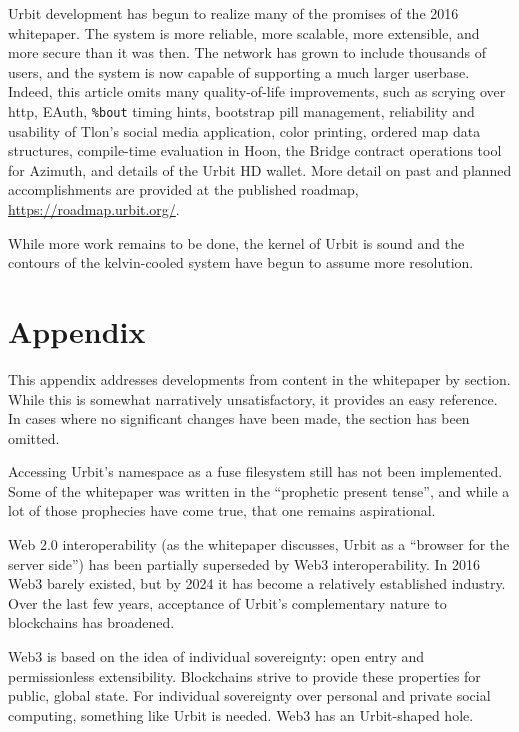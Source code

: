 \documentclass[twoside]{article}
\begin{document}
Urbit development has begun to realize many of the promises of the 2016 whitepaper.  The system is more reliable, more scalable, more extensible, and more secure than it was then.  The network has grown to include thousands of users, and the system is now capable of supporting a much larger userbase.  Indeed, this article omits many quality-of-life improvements, such as scrying over {\sc http}, EAuth, \lstinline[style=inlinecode]{%bout} timing hints, bootstrap pill management, reliability and usability of Tlon's social media application, color printing, ordered map data structures, compile-time evaluation in Hoon, the Bridge contract operations tool for Azimuth, and details of the Urbit HD wallet.  More detail on past and planned accomplishments are provided at the published roadmap, \url{https://roadmap.urbit.org/}.

While more work remains to be done, the kernel of Urbit is sound and the contours of the kelvin-cooled system have begun to assume more resolution.  \tombstone{}

\section*{Appendix}

This appendix addresses developments from content in the whitepaper by section.  While this is somewhat narratively unsatisfactory, it provides an easy reference.  In cases where no significant changes have been made, the section has been omitted.

Accessing Urbit's namespace as a {\sc fuse} filesystem still has not been implemented.  Some of the whitepaper was written in the ``prophetic present tense'', and while a lot of those prophecies have come true, that one remains aspirational.

Web 2.0 interoperability (as the whitepaper discusses, Urbit as a ``browser for the server side'') has been partially superseded by Web3 interoperability.  In 2016 Web3 barely existed, but by 2024 it has become a relatively established industry.  Over the last few years, acceptance of Urbit's complementary nature to blockchains has broadened.

Web3 is based on the idea of individual sovereignty: open entry and permissionless extensibility.  Blockchains strive to provide these properties for public, global state.  For individual sovereignty over personal and private social computing, something like Urbit is needed.  Web3 has an Urbit-shaped hole.
\end{document}

